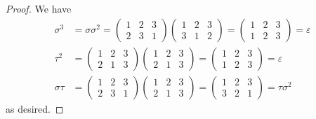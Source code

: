 \documentclass{article}
\begin{document}
\begin{itemize}
\begin{itemize}
\begin{proof}
					We have 
					\begin{align*}
						\sigma^3 &= \sigma\sigma^2 = \begin{pmatrix}
							1 & 2 & 3 \\
							2 & 3 & 1
						\end{pmatrix} \begin{pmatrix}
							1 & 2 & 3 \\
							3 & 1 & 2
						\end{pmatrix} = \begin{pmatrix}
							1 & 2 & 3 \\
							1 & 2 & 3 
						\end{pmatrix} = \varepsilon \\
						\tau^2 &= \begin{pmatrix}
							1 & 2 & 3 \\
							2 & 1 & 3
						\end{pmatrix} \begin{pmatrix}
							1 & 2 & 3 \\
							2 & 1 & 3
						\end{pmatrix} = \begin{pmatrix}
							1 & 2 & 3 \\
							1 & 2 & 3
						\end{pmatrix} = \varepsilon \\
						\sigma\tau &= \begin{pmatrix}
							1 & 2 & 3 \\
							2 & 3 & 1
						\end{pmatrix} \begin{pmatrix}
							1 & 2 & 3 \\
							2 & 1 & 3
						\end{pmatrix} = \begin{pmatrix}
							1 & 2 & 3 \\
							3 & 2 & 1
						\end{pmatrix} = \tau\sigma^2
					\end{align*} as desired.
				\end{proof}


\end{itemize}
\end{itemize}
\end{document}
